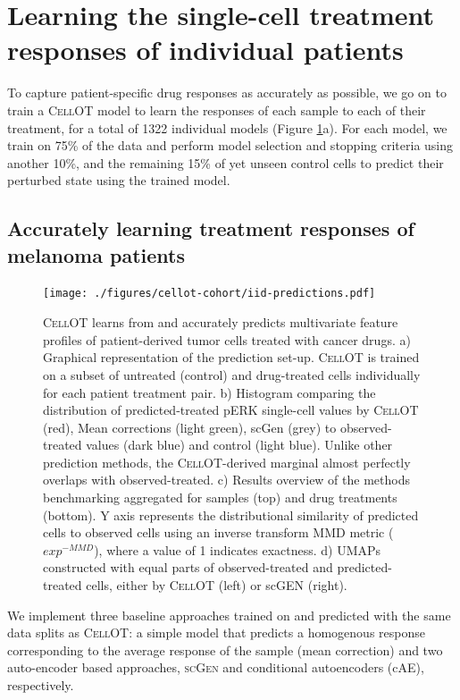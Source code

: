 \section{Learning the single-cell treatment responses of individual patients} \label{sec:cellot-cohort-iid}
To capture patient-specific drug responses as accurately as possible, we go on to train a \textsc{CellOT} model to learn the responses of each sample to each of their treatment, for a total of 1322 individual models (Figure \ref{fig:iid-prediction}a).
For each model, we train on 75\% of the data and perform model selection and stopping criteria using another 10\%,
and the remaining 15\% of yet unseen control cells to predict their perturbed state using the trained model.

\subsection{Accurately learning treatment responses of melanoma patients}

\begin{figure}[hp!]
  \begin{center}
    \texttt{[image: ./figures/cellot-cohort/iid-predictions.pdf]}
  \end{center}
  \caption{\textsc{CellOT} learns from and accurately predicts multivariate feature profiles of patient-derived tumor cells treated with cancer drugs.
  a) Graphical representation of the prediction set-up. \textsc{CellOT} is trained on a subset of untreated (control) and drug-treated cells individually for each patient treatment pair. 
  b) Histogram comparing the distribution of predicted-treated pERK single-cell values by \textsc{CellOT} (red), Mean corrections (light green), scGen (grey) to observed-treated values (dark blue) and control (light blue). Unlike other prediction methods, the \textsc{CellOT}-derived marginal almost perfectly overlaps with observed-treated.
  c) Results overview of the methods benchmarking aggregated for samples (top) and drug treatments (bottom). Y axis represents the distributional similarity of predicted cells to observed cells using an inverse transform MMD metric ($exp^{-MMD}$), where a value of 1 indicates exactness. 
d) UMAPs constructed with equal parts of observed-treated and predicted-treated cells, either by \textsc{CellOT} (left) or scGEN (right).}
  \label{fig:iid-prediction}
\end{figure}

We implement three baseline approaches trained on and predicted with the same data splits as \textsc{CellOT}: a simple model that predicts a homogenous response corresponding to the average response of the sample (mean correction) and two auto-encoder based approaches, \textsc{scGen} \cite{lotfollahi2019} and conditional autoencoders \cite{lopez2018} (cAE), respectively. 

